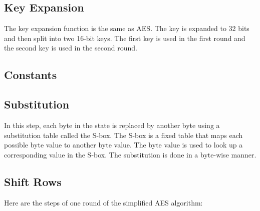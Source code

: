 \documentclass[openany]{book}
\begin{document}
\subsection{Key Expansion}
The key expansion function is the same as AES. The key is expanded to 32 bits and
then split into two 16-bit keys. The first key is used in the first round and the second key is used in the second round.
\subsection{Constants}

\subsection{Substitution}
In this step, each byte in the state is replaced by another byte using a substitution table called the S-box. The S-box is a fixed table that maps each possible byte value to another byte value. The byte value is used to look up a corresponding value in the S-box. The substitution is done in a byte-wise manner.
\subsection{Shift Rows}






Here are the steps of one round of the simplified AES algorithm:
\end{document}
